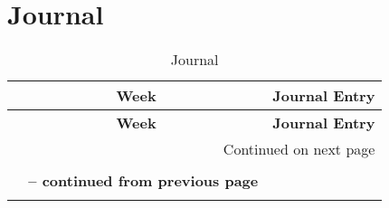 \chapter{Journal}
\begin{center}
\begin{longtable}{|c|p{12cm}|}

\hline \multicolumn{1}{|c|}{\textbf{Week}} & \multicolumn{1}{c|}{\textbf{Journal Entry}} \\ \hline 
\endfirsthead

\hline \multicolumn{1}{|c|}{\textbf{Week}} &
\multicolumn{1}{c|}{\textbf{Journal Entry}} \\
\endhead

\hline \multicolumn{2}{|r|}{{Continued on next page}} \\ \hline
\caption[Journal]{Journal} \label{table:journal} \\
\endfoot

\multicolumn{2}{c}%
{{\bfseries \tablename\ \thetable{} -- continued from previous page}} \\
\endlastfoot


\end{longtable}
\end{center}
